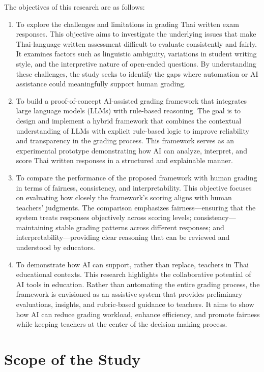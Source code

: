 The objectives of this research are as follows:
\begin{enumerate}
    \item To explore the challenges and limitations in grading Thai written exam responses. This objective aims to investigate the underlying issues that make Thai-language written assessment difficult to evaluate consistently and fairly. It examines factors such as linguistic ambiguity, variations in student writing style, and the interpretive nature of open-ended questions. By understanding these challenges, the study seeks to identify the gaps where automation or AI assistance could meaningfully support human grading.
    \item To build a proof-of-concept AI-assisted grading framework that integrates large language models (LLMs) with rule-based reasoning. The goal is to design and implement a hybrid framework that combines the contextual understanding of LLMs with explicit rule-based logic to improve reliability and transparency in the grading process. This framework serves as an experimental prototype demonstrating how AI can analyze, interpret, and score Thai written responses in a structured and explainable manner.
    \item To compare the performance of the proposed framework with human grading in terms of fairness, consistency, and interpretability. This objective focuses on evaluating how closely the framework’s scoring aligns with human teachers’ judgments. The comparison emphasizes fairness—ensuring that the system treats responses objectively across scoring levels; consistency—maintaining stable grading patterns across different responses; and interpretability—providing clear reasoning that can be reviewed and understood by educators.
    \item To demonstrate how AI can support, rather than replace, teachers in Thai educational contexts. This research highlights the collaborative potential of AI tools in education. Rather than automating the entire grading process, the framework is envisioned as an assistive system that provides preliminary evaluations, insights, and rubric-based guidance to teachers. It aims to show how AI can reduce grading workload, enhance efficiency, and promote fairness while keeping teachers at the center of the decision-making process.
\end{enumerate}

\section{Scope of the Study}

